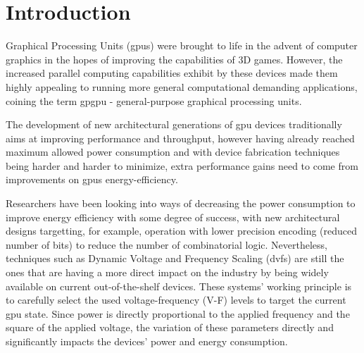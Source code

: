 
\chapter{Introduction}
\label{chapter:introduction}

Graphical Processing Units (\acrshort{gpu}s) were brought to life in the advent of computer graphics in the hopes of improving the capabilities of 3D games. However, the increased parallel computing capabilities exhibit by these devices made them highly appealing to running more general computational demanding applications, coining the term \acrshort{gpgpu} - general-purpose graphical processing units.

The development of new architectural generations of \acrshort{gpu} devices traditionally aims at improving performance and throughput, however having already reached maximum allowed power consumption and with device fabrication techniques being harder and harder to minimize, extra performance gains need to come from improvements on  \acrshort{gpu}s energy-efficiency.

Researchers have been looking into ways of decreasing the power consumption to improve energy efficiency with some degree of success, with new architectural designs targetting, for example, operation with lower precision encoding (reduced number of bits) to reduce the number of combinatorial logic. Nevertheless, techniques such as Dynamic Voltage and Frequency Scaling (\acrshort{dvfs}) are still the ones that are having a more direct impact on the industry by being widely available on current out-of-the-shelf devices. These systems' working principle is to carefully select the used voltage-frequency (V-F) levels to target the current \acrshort{gpu} state. Since power is directly proportional to the applied frequency and the square of the applied voltage, the variation of these parameters directly and significantly impacts the devices' power and energy consumption.

